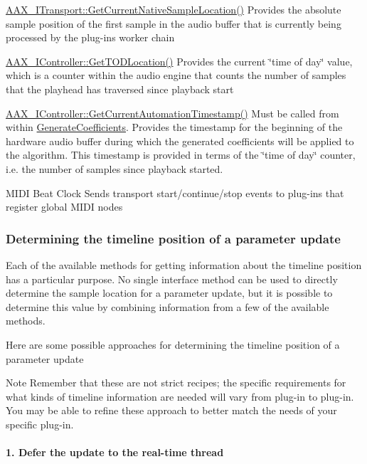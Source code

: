 \begin{DoxyItemize}
\item \mbox{\hyperlink{a01885_a8119233b03774528ffaa519771d792a0}{A\+A\+X\+\_\+\+I\+Transport\+::\+Get\+Current\+Native\+Sample\+Location()}}  Provides the absolute sample position of the first sample in the audio buffer that is currently being processed by the plug-\/in\textquotesingle{}s worker chain   
\item \mbox{\hyperlink{a01789_afbc2973d755b6c3ae82b6c8461e9fdee}{A\+A\+X\+\_\+\+I\+Controller\+::\+Get\+T\+O\+D\+Location()}}  Provides the current \char`\"{}time of day\char`\"{} value, which is a counter within the audio engine that counts the number of samples that the playhead has traversed since playback start   
\item \mbox{\hyperlink{a01789_af9ab9b228023e116f89249a56c27a20f}{A\+A\+X\+\_\+\+I\+Controller\+::\+Get\+Current\+Automation\+Timestamp()}}  Must be called from within \mbox{\hyperlink{a01669_a083265b008921b6114ede387711694b7}{Generate\+Coefficients}}. Provides the timestamp for the beginning of the hardware audio buffer during which the generated coefficients will be applied to the algorithm. This timestamp is provided in terms of the \char`\"{}time of day\char`\"{} counter, i.\+e. the number of samples since playback started.   
\item M\+I\+DI Beat Clock  Sends transport start/continue/stop events to plug-\/ins that register global M\+I\+DI nodes   
\end{DoxyItemize}\hypertarget{a00821_parameterUpdateTiming_determiningTimelinePosition}{}\subsubsection{Determining the timeline position of a parameter update}\label{a00821_parameterUpdateTiming_determiningTimelinePosition}
Each of the available methods for getting information about the timeline position has a particular purpose. No single interface method can be used to directly determine the sample location for a parameter update, but it is possible to determine this value by combining information from a few of the available methods.

Here are some possible approaches for determining the timeline position of a parameter update

\begin{DoxyNote}{Note}
Remember that these are not strict recipes; the specific requirements for what kinds of timeline information are needed will vary from plug-\/in to plug-\/in. You may be able to refine these approach to better match the needs of your specific plug-\/in.
\end{DoxyNote}
\hypertarget{a00821_parameterUpdateTiming_determiningTimelinePosition_1}{}\paragraph{1. Defer the update to the real-\/time thread}\label{a00821_parameterUpdateTiming_determiningTimelinePosition_1}

